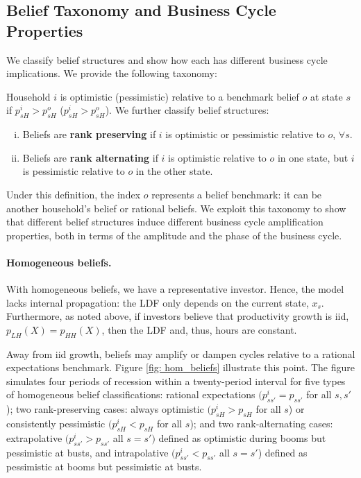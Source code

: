 \subsection{Belief Taxonomy and Business Cycle Properties}

We classify belief structures and show how each has different business cycle implications. We provide the following taxonomy: 
\begin{definition} Household $i$ is optimistic (pessimistic) relative to a benchmark belief $o$ at state $s$ if $p_{sH}^i > p_{sH}^o$ ($p_{sH}^i > p_{sH}^o$). We further classify belief structures:
\begin{enumerate}[(i)]
    \item Beliefs are \textbf{rank preserving}  if $i$ is optimistic or pessimistic relative to $o$, $\forall s$.
    \item Beliefs are \textbf{rank alternating}  if $i$ is optimistic relative to $o$ in one state, but $i$ is pessimistic relative to $o$ in the other state. 
\end{enumerate}
\end{definition}
Under this definition, the index $o$ represents a belief benchmark: it can be another household's belief or rational beliefs. We exploit this taxonomy to show that different belief structures induce different business cycle amplification properties, both in terms of the amplitude and the phase of the business cycle. 

\paragraph{Homogeneous beliefs.}
With homogeneous beliefs, we have a representative investor. Hence, the model lacks internal propagation: the LDF only depends on the current state, $x_s$.
Furthermore, as noted above, if investors believe that productivity growth is iid, $p_{LH}(X) = p_{HH}(X)$, then the LDF and, thus, hours are constant. 

Away from iid growth, beliefs may amplify or dampen cycles relative to a rational expectations benchmark. Figure \ref{fig: hom_beliefs} illustrate this point. The figure simulates four periods of recession within a twenty-period interval for five types of homogeneous belief classifications: rational expectations $(p_{ss'}^i = p_{ss'}$ for all $s,s'$); two rank-preserving cases: always optimistic $(p_{sH}^i > p_{sH}$ for all $s$) or consistently pessimistic $(p_{sH}^i < p_{sH}$ for all $s$); and two rank-alternating cases: extrapolative $(p_{ss'}^i > p_{s s'}$ all $s=s')$ defined as optimistic during booms but pessimistic at busts, and intrapolative $(p_{ss'}^i < p_{ss'}$ all $s = s'$) defined as pessimistic at booms but pessimistic at busts.


